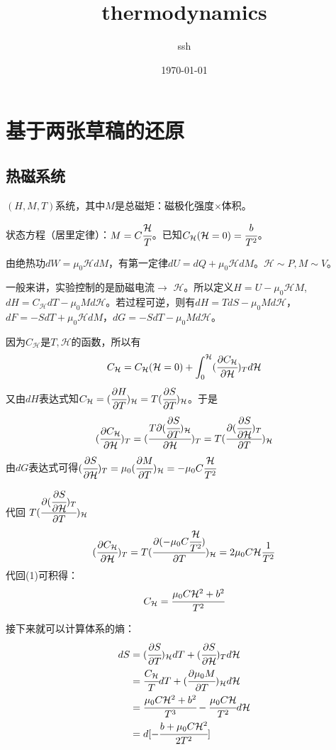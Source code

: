 \documentclass[a4paper,12pt]{article}
\title{thermodynamics}
\author{ssh}
\date{\today}
\newcommand{\Hc}{\mathcal{H}}
\newcommand{\myp}[3]{(\cfrac{\partial{#1}}{\partial{#2}})_{#3}}
\begin{document}
\maketitle

\section{基于两张草稿的还原}
\subsection{热磁系统}
$(H, M, T)$系统，其中$M$是总磁矩：磁极化强度$\times$体积。\par
状态方程（居里定律）：$M = C\cfrac{\Hc}{T}$。已知$C_{\Hc}(\Hc = 0) = \cfrac{b}{T^2}$。\par
由绝热功$dW = \mu_0 \Hc dM$，有第一定律$dU = dQ + \mu_0 \Hc dM$。$\Hc \sim P, M \sim V$。\par
一般来讲，实验控制的是励磁电流$\rightarrow$ $\Hc$。所以定义$H = U - \mu_0 \Hc M$, $dH = C_{\Hc}dT - \mu_0 M d\Hc$。若过程可逆，则有$dH = TdS - \mu_0 M d\Hc$，$dF = -SdT + \mu_0 \Hc dM$，$dG = -SdT - \mu_0 M d\Hc$。\par
因为$C_{\Hc}$是$T, \Hc$的函数，所以有
\begin{equation}
C_{\Hc} = C_{\Hc}(\Hc = 0) + \int_0^{\Hc} \myp{C_{\Hc}}{\Hc}{T} d\Hc 
\end{equation}
又由$dH$表达式知$C_{\Hc} = \myp{H}{T}{\Hc} = T\myp{S}{T}{\Hc}$。于是
\begin{equation}
\myp{C_{\Hc}}{\Hc}{T} = (\cfrac{T\partial{\myp{S}{T}{\Hc}}}{\partial{\Hc}})_{T} = T\myp{\myp{S}{\Hc}{T}}{T}{\Hc} 
\end{equation}
由$dG$表达式可得$\myp{S}{\Hc}{T} = \mu_0 \myp{M}{T}{\Hc} =  - \mu_0 C \cfrac{\Hc}{T^2}$\par
代回 $T\myp{\myp{S}{\Hc}{T}}{T}{\Hc}$
\begin{equation}
\myp{C_{\Hc}}{\Hc}{T} = T\myp{( - \mu_0 C \cfrac{\Hc}{T^2})}{T}{\Hc} = 2\mu_0 C \Hc \frac{1}{T^2} 
\end{equation}
代回(1)可积得：
\begin{equation}
C_{\Hc} = \cfrac{\mu_0 C \Hc^2 + b^2}{T^2}
\end{equation}

\newpage
接下来就可以计算体系的熵：
\begin{subequations}
\begin{align*}
dS &= \myp{S}{T}{\Hc}dT + \myp{S}{\Hc}{T} d\Hc \\
   &= \cfrac{C_{\Hc}}{T}dT + \myp{\mu_0 M}{T}{\Hc} d\Hc \\
   &= \cfrac{\mu_0 C \Hc^2 + b^2}{T^3} - \cfrac{\mu_0 C \Hc}{T^2}d\Hc \\
   &= d[- \cfrac{b + \mu_0 C \Hc^2}{2 T^2}] \\
\end{align*}
\end{subequations}
\end{document}
